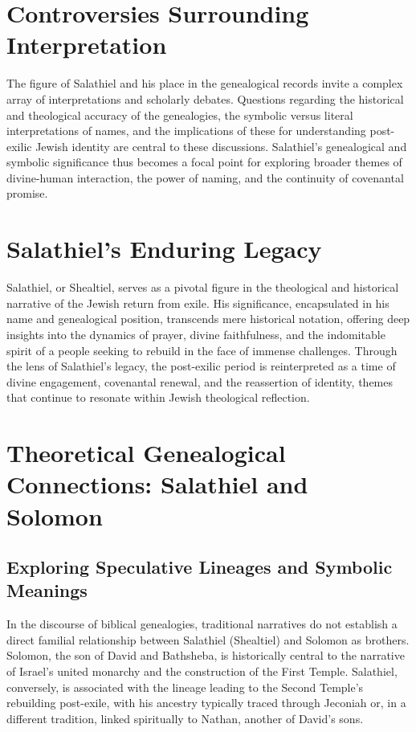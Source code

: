 \chapter{Controversies Surrounding Interpretation}
The figure of Salathiel and his place in the genealogical records invite a complex array of interpretations and scholarly debates. Questions regarding the historical and theological accuracy of the genealogies, the symbolic versus literal interpretations of names, and the implications of these for understanding post-exilic Jewish identity are central to these discussions. Salathiel’s genealogical and symbolic significance thus becomes a focal point for exploring broader themes of divine-human interaction, the power of naming, and the continuity of covenantal promise.

\chapter{Salathiel’s Enduring Legacy}
Salathiel, or Shealtiel, serves as a pivotal figure in the theological and historical narrative of the Jewish return from exile. His significance, encapsulated in his name and genealogical position, transcends mere historical notation, offering deep insights into the dynamics of prayer, divine faithfulness, and the indomitable spirit of a people seeking to rebuild in the face of immense challenges. Through the lens of Salathiel’s legacy, the post-exilic period is reinterpreted as a time of divine engagement, covenantal renewal, and the reassertion of identity, themes that continue to resonate within Jewish theological reflection.

\chapter{Theoretical Genealogical Connections: Salathiel and Solomon}

\section{Exploring Speculative Lineages and Symbolic Meanings}

In the discourse of biblical genealogies, traditional narratives do not establish a direct familial relationship between Salathiel (Shealtiel) and Solomon as brothers. Solomon, the son of David and Bathsheba, is historically central to the narrative of Israel's united monarchy and the construction of the First Temple. Salathiel, conversely, is associated with the lineage leading to the Second Temple's rebuilding post-exile, with his ancestry typically traced through Jeconiah or, in a different tradition, linked spiritually to Nathan, another of David's sons.

